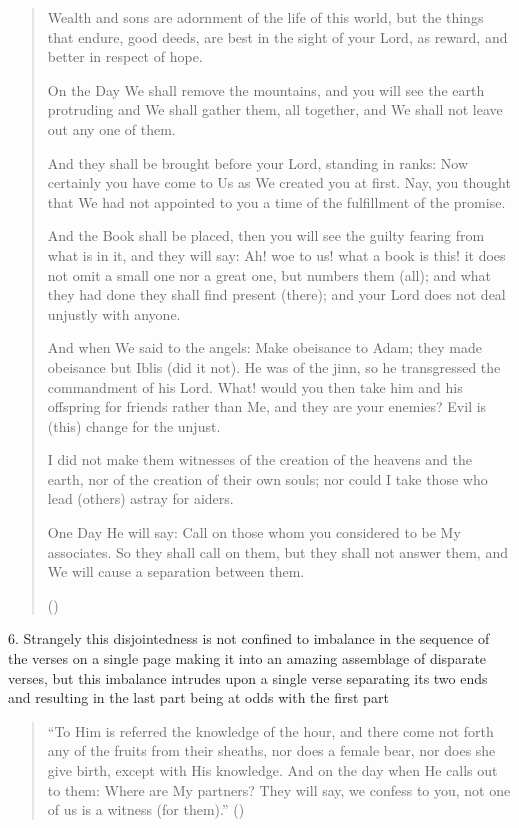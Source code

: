 \documentclass[12pt]{memoir}
\begin{document}
\begin{quote}
Wealth and sons are adornment of the life of this world,
but the things that endure, good deeds, are best in the sight of your Lord,
as reward, and better in respect of hope.

On the Day We shall remove the mountains,
and you will see the earth protruding and We shall gather them,
all together, and We shall not leave out any one of them.

And they shall be brought before your Lord, standing in ranks:
Now certainly you have come to Us as We created you at first.
Nay, you thought that We had not appointed to you
a time of the fulfillment of the promise.

And the Book shall be placed,
then you will see the guilty fearing from what is in it, and they will say:
Ah! woe to us! what a book is this!
it does not omit a small one nor a great one, but numbers them (all);
and what they had done they shall find present (there);
and your Lord does not deal unjustly with anyone.

And when We said to the angels: Make obeisance to Adam;
they made obeisance but Iblis (did it not).
He was of the jinn, so he transgressed the commandment of his Lord.
What! would you then take him and his offspring for friends rather than Me,
and they are your enemies?
Evil is (this) change for the unjust.

I did not make them witnesses of the creation of the heavens and the earth,
nor of the creation of their own souls;
nor could I take those who lead (others) astray for aiders.

One Day He will say: Call on those whom you considered to be My associates.
So they shall call on them, but they shall not answer them,
and We will cause a separation between them.

()
\end{quote}

6. Strangely this disjointedness is not confined to imbalance
in the sequence of the verses on a single page making it
into an amazing assemblage of disparate verses,
but this imbalance intrudes upon a single verse separating its two ends
and resulting in the last part being at odds with the first part

\begin{quote}
“To Him is referred the knowledge of the hour,
and there come not forth any of the fruits from their sheaths,
nor does a female bear, nor does she give birth, except with His knowledge.
And on the day when He calls out to them: Where are My partners?
They will say, we confess to you, not one of us is a witness (for them).”
()
\end{quote}
\end{document}
